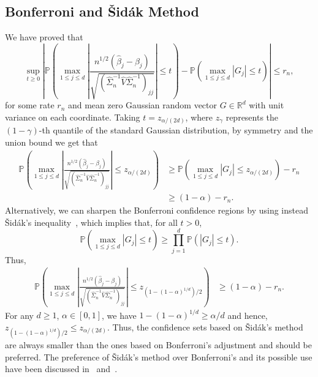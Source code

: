 \documentclass[11pt]{article}
\begin{document}
\subsection{Bonferroni and {\v{S}}id{\'a}k Method}\label{subsec:bonferroni.sidak}

We have proved that
\[
\sup_{t\ge 0}\left|\mathbb{P}\left(\max_{1\le j\le d}\left|\frac{n^{1/2}(\widehat{\beta}_j - \beta_j)}{\sqrt{(\widehat{\Sigma}_n^{-1}\widehat{V}\widehat{\Sigma}_n^{-1})_{jj}}}\right| \le t\right) - \mathbb{P}\left(\max_{1\le j\le d}|G_j| \le t\right)\right| \le r_n,
\]
for some rate $r_n$ and mean zero Gaussian random vector $G\in\mathbb{R}^d$ with unit variance on each coordinate. Taking $t = z_{\alpha/(2d)}$, where $z_{\gamma}$ represents the $(1-\gamma)$-th quantile of the standard Gaussian distribution, by symmetry and the union bound we get that
\begin{align*}
\mathbb{P}\left(\max_{1\le j\le d}\left|\frac{n^{1/2}(\widehat{\beta}_j - \beta_j)}{\sqrt{(\widehat{\Sigma}_n^{-1}\widehat{V}\widehat{\Sigma}_n^{-1})_{jj}}}\right| \le z_{\alpha/(2d)}\right) &\ge \mathbb{P}\left(\max_{1\le j\le d}|G_j| \le z_{\alpha/(2d)}\right) - r_n\\
&\ge (1 - \alpha) - r_n.
\end{align*}
Alternatively, we can sharpen the Bonferroni confidence regions by using instead  {\v{S}}id{\'a}k's inequality~\citep[Corollary 1]{vsidak1967rectangular}, which implies that, for all $t > 0$,
\[
\mathbb{P}\left(\max_{1\le j\le d}|G_j| \le t\right) \ge \prod_{j=1}^d \mathbb{P}(|G_j| \le t).
\]
Thus,
\begin{align*}
\mathbb{P}\left(\max_{1\le j\le d}\left|\frac{n^{1/2}(\widehat{\beta}_j - \beta_j)}{\sqrt{(\widehat{\Sigma}_n^{-1}\widehat{V}\widehat{\Sigma}_n^{-1})_{jj}}}\right| \le z_{(1 - (1-\alpha)^{1/d})/2}\right) &\ge (1 - \alpha) - r_n.
\end{align*}
For any $d \ge 1$, $\alpha\in[0, 1]$, we have $1 - (1 - \alpha)^{1/d} \ge \alpha/d$
and hence, $z_{(1- (1-\alpha)^{1/d})/2} \le z_{\alpha/(2d)}$. Thus, the confidence sets based on  {\v{S}}id{\'a}k's method are always smaller than the ones based on Bonferroni's adjustment and should be preferred. 
The preference of {\v{S}}id{\'a}k's method over Bonferroni's and its possible use have been discussed in~\cite{westfall1993resampling} and~\cite{drton2004model}.
\end{document}
